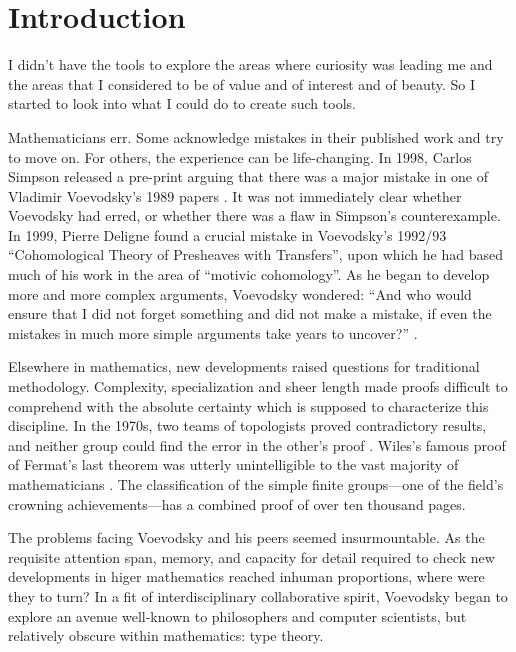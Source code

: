\documentclass[12pt,twoside]{reedthesis}
\begin{document}
\chapter*{Introduction}

\setlength{\epigraphwidth}{0.8\textwidth}
\epigraph{I didn’t have the tools to explore the areas where curiosity was
  leading me and the areas that I considered to be of value and of interest and
  of beauty. So I started to look into what I could do to create such tools.}{\cite{voevodsky-ias}}

Mathematicians err. Some acknowledge mistakes in their published work and
try to move on. For others, the experience can be life-changing. In 1998, Carlos
Simpson released a pre-print arguing that there was a major mistake in one of
Vladimir Voevodsky's 1989 papers \cite{voevodsky-presentation}. It was not
immediately clear whether Voevodsky had erred, or whether there was a flaw in
Simpson's counterexample. In 1999, Pierre Deligne found a crucial mistake in
Voevodsky's 1992/93 ``Cohomological Theory of Presheaves with Transfers'', upon
which he had based much of his work in the area of ``motivic cohomology''. As he
began to develop more and more complex arguments, Voevodsky wondered: ``And who
would ensure that I did not forget something and did not make a mistake, if even
the mistakes in much more simple arguments take years to uncover?''
\cite{voevodsky-ias}.

Elsewhere in mathematics, new developments raised questions for traditional
methodology. Complexity, specialization and sheer length made
proofs difficult to comprehend with the absolute certainty which is
supposed to characterize this discipline. In the 1970s, two teams of
topologists proved contradictory results, and neither group could find the error
in the other's proof \cite{kolata}. Wiles's famous proof of Fermat's last
theorem was utterly unintelligible to the vast majority of mathematicians
\cite{nyt}. The classification of the simple finite groups---one of the field's
crowning achievements---has a combined proof of over ten thousand pages.

The problems facing Voevodsky and his peers seemed insurmountable.
As the requisite attention span, memory, and capacity for detail required to
check new developments in higer mathematics reached inhuman proportions,
where were they to turn? In a fit of interdisciplinary collaborative spirit,
Voevodsky began to explore an avenue well-known to philosophers and computer
scientists, but relatively obscure within mathematics: type theory.
\end{document}
